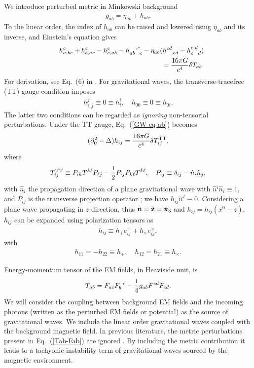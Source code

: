 \documentclass[twocolumn,amsmath,amssymb]{revtex4}
\newcommand{\bea}{\begin{eqnarray}}
\newcommand{\eea}{\end{eqnarray}}
\begin{document}
We introduce perturbed metric in Minkowski background
\bea
   g_{ab} = \eta_{ab} + h_{ab}.
\eea
To the linear order, the index of $h_{ab}$ can be raised and lowered using $\eta_{ab}$ and its inverse, and Einstein's equation gives
\bea
   & & h^c_{a,bc} + h^c_{b,ac}
       - h^c_{c,ab} - h^{\;\;\;\;,c}_{ab\;\;\; c}
       - \eta_{ab} ( h^{cd}_{\;\;\;,cd}
       - h^{c,d}_{c\;\;\; d} )
   \nonumber \\
   & & \qquad
       = {16 \pi G \over c^4} \delta T_{ab}.
   \label{GW-eq-ab}
\eea
For derivation, see Eq.\ (6) in \cite{EM-definition}. For gravitational waves, the transverse-tracefree (TT) gauge condition imposes
\bea
   h^j_{i,j} \equiv 0 \equiv h^i_i, \quad
       h_{00} \equiv 0 \equiv h_{0i}.
\eea
The latter two conditions can be regarded as {\it ignoring} non-tensorial perturbations. Under the TT gauge, Eq.\ (\ref{GW-eq-ab}) becomes
\bea
   ( \partial_0^2 - \Delta ) h_{ij}
       = {16 \pi G \over c^4} \delta T_{ij}^{\rm TT},
   \label{GW-eq-ij}
\eea
where
\bea
   T_{ij}^{\rm TT} \equiv P_{ik} T^{k\ell} P_{\ell j}
       - {1 \over 2} P_{ij} P_{k\ell} T^{k\ell}, \quad
       P_{ij} \equiv \delta_{ij} - \hat n_i \hat n_j,
\eea
with $\hat n{}_i$ the propagation direction of a plane gravitational wave with $\hat n{}^i \hat n{}_i \equiv 1$, and $P_{ij}$ is the transverse projection operator \cite{Maggiore-2007}; we have $h_{ij} \hat n^j \equiv 0$.
Considering a plane wave propagating in $z$-direction, thus $\hat {\bf n} = \hat {\bf z} = \hat {\bf x}_3$ and $h_{ij} = h_{ij} (x^0 - z)$, $h_{ij}$ can be expanded using polarization tensors as
\bea
   h_{ij} \equiv h_+ e^+_{ij} + h_\times e^\times_{ij},
\eea
with
\bea
   h_{11} = - h_{22} \equiv h_+, \quad
       h_{12} = h_{21} \equiv h_\times.
\eea

Energy-momentum tensor of the EM fields, in Heaviside unit, is
\bea
   T_{ab} = F_{ac} F_b^{\;\;c}
       - {1 \over 4} g_{ab} F^{cd} F_{cd}.
   \label{Tab-Fab}
\eea
We will consider the coupling between background EM fields and the incoming photons (written as the perturbed EM fields or potential) as the source of gravitational waves. We include the linear order gravitational waves coupled with the background magnetic field. In previous literature, the metric perturbations present in Eq.\ (\ref{Tab-Fab}) are ignored \cite{Raffelt-1988, Ejlli-Thandlam-2019, Fujita-2020, Domcke-2021, Palessandro-Rothman-2023, Ramazanov-2023}. By including the metric contribution it leads to a tachyonic instability term of gravitational waves sourced by the magnetic environment.
\end{document}
